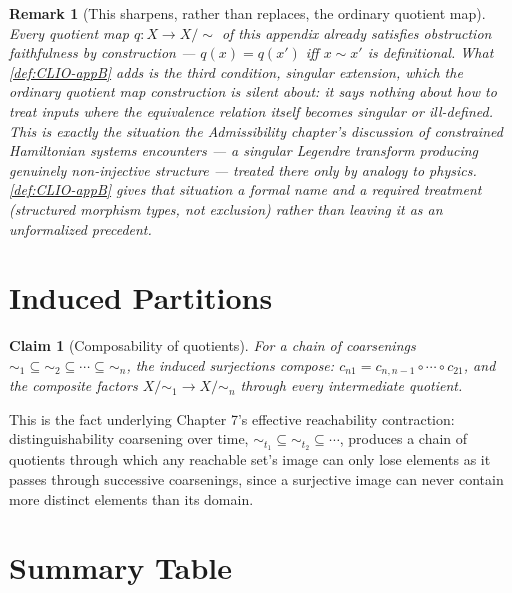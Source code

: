 \documentclass[12pt]{report}
\newtheorem{claim}[definition]{Claim}
\newtheorem{remark}[definition]{Remark}
\begin{document}
\begin{remark}[This sharpens, rather than replaces, the ordinary quotient map]
\label{rem:CLIO-vs-quotient}
Every quotient map $q : X \to X/{\sim}$ of this appendix already
satisfies obstruction faithfulness by construction --- $q(x) = q(x')$
iff $x \sim x'$ is definitional. What \cref{def:CLIO-appB} adds is the
third condition, singular extension, which the ordinary quotient map
construction is silent about: it says nothing about how to treat inputs
where the equivalence relation itself becomes singular or ill-defined.
This is exactly the situation the Admissibility chapter's discussion of
constrained Hamiltonian systems encounters --- a singular Legendre
transform producing genuinely non-injective structure --- treated there
only by analogy to physics. \cref{def:CLIO-appB} gives that situation a
formal name and a required treatment (structured morphism types, not
exclusion) rather than leaving it as an unformalized precedent.
\end{remark}

\section*{Induced Partitions}

\begin{claim}[Composability of quotients]
For a chain of coarsenings $\sim_1 \subseteq \sim_2 \subseteq \cdots
\subseteq \sim_n$, the induced surjections compose:
$c_{n1} = c_{n,n-1} \circ \cdots \circ c_{21}$, and the composite factors
$X/{\sim_1} \to X/{\sim_n}$ through every intermediate quotient.
\end{claim}

This is the fact underlying Chapter 7's effective reachability
contraction: distinguishability coarsening over time, $\sim_{t_1}
\subseteq \sim_{t_2} \subseteq \cdots$, produces a chain of quotients
through which any reachable set's image can only lose elements as it
passes through successive coarsenings, since a surjective image can
never contain more distinct elements than its domain.

\section*{Summary Table}
\end{document}
